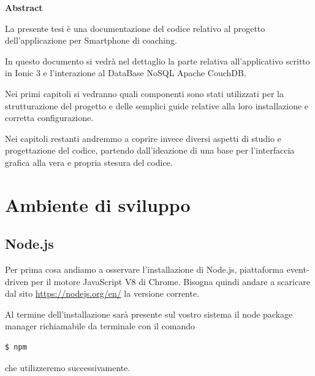 \documentclass[a4paper,titlepage]{book}
\makeatletter
\newcommand\abstractname{Abstract}  %
\newenvironment{abstract}{%
      \titlepage
      \null\vfil
      \@beginparpenalty\@lowpenalty
      \begin{center}%
        \bfseries \abstractname
        \@endparpenalty\@M
      \end{center}}%
     {\par\vfil\null\endtitlepage}
\newenvironment{abstract}{%
      \if@twocolumn
        \section*{\abstractname}%
      \else
        \small
        \begin{center}%
          {\bfseries \abstractname\vspace{-.5em}\vspace{\z@}}%
        \end{center}%
        \quotation
      \fi}
      {\if@twocolumn\else\endquotation\fi}
\makeatother
\begin{document}
\pagestyle{plain}

\begin{frontespizio}
\end{frontespizio}

\frontmatter

\begin{abstract}
La presente tesi \`{e} una documentazione del codice relativo al progetto dell'applicazione per {\foreignlanguage{english} Smartphone} di {\foreignlanguage{english} coaching}. 

In questo documento si vedr\`{a} nel dettaglio la parte relativa all'applicativo scritto in Ionic 3 e l'interazione al {\foreignlanguage{english} DataBase NoSQL} Apache CouchDB.

Nei primi capitoli si vedranno quali componenti sono stati utilizzati per la strutturazione del progetto e delle semplici guide relative alla loro installazione e corretta configurazione.

Nei capitoli restanti andremmo a coprire invece diversi aspetti di studio e progettazione del codice, partendo dall'ideazione di una base per l'interfaccia grafica alla vera e propria stesura del codice.
\end{abstract}

\tableofcontents

\mainmatter
\chapter{Ambiente di sviluppo}


\section{Node.js}
Per prima cosa andiamo a osservare l'installazione di Node.js, piattaforma {\foreignlanguage{english} event-driven} per il motore JavaScript V8 di Chrome. Bisogna quindi andare a scaricare dal sito \url{https://nodejs.org/en/} la versione corrente.

Al termine dell'installazione sar\`{a} presente sul vostro sistema il {\foreignlanguage{english} node package manager} richiamabile da terminale con il comando
\begin{lstlisting}[language=bash]
  $ npm
\end{lstlisting}
che utilizzeremo successivamente.
\end{document}
